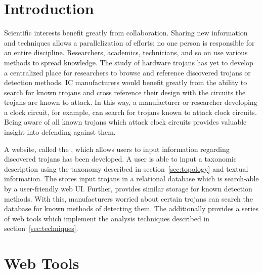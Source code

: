 \label{chapter:webSite}
\section{Introduction}
Scientific interests benefit greatly from collaboration.
Sharing new information and techniques allows a parallelization of efforts; no one person is responsible for an entire discipline.
Researchers, academics, technicians, and so on use various methods to spread knowledge.
The study of hardware trojans has yet to develop a centralized place for researchers to browse and reference discovered trojans or detection methods.
\acrfull{IC} manufacturers would benefit greatly from the ability to search for known trojans and cross reference their design with the circuits the trojans are known to attack.
In this way, a manufacturer or researcher developing a clock circuit, for example, can search for trojans known to attack clock circuits.
Being aware of all known trojans which attack clock circuits provides valuable insight into defending against them.

A website, called the \WebName, which allows users to input information regarding discovered trojans has been developed.
A user is able to input a taxonomic description using the taxonomy described in section~\ref{sec:topology} and textual information. 
The \WebNameNoPeriod stores input trojans in a relational database which is search-able by a user-friendly web \acrshort{UI}.
Further, \WebNameNoPeriod provides similar storage for known detection methods. 
With this, manufacturers worried about certain trojans can search the database for known methods of detecting them. 
The \WebNameNoPeriod additionally provides a series of web tools which implement the analysis techniques described in section~\ref{sec:techniques}.
\section{Web Tools}
